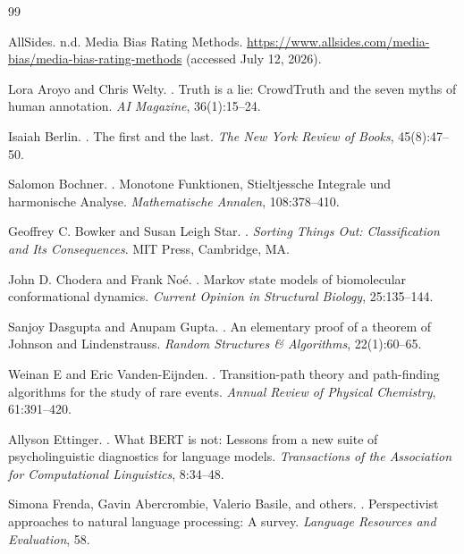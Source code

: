 \documentclass[12pt]{article}
\begin{document}
\newpage
\begin{thebibliography}{99}

AllSides.
\newblock n.d.
\newblock Media Bias Rating Methods.
\newblock \url{https://www.allsides.com/media-bias/media-bias-rating-methods} (accessed July 12, 2026).

Lora Aroyo and Chris Welty.
.
\newblock Truth is a lie: CrowdTruth and the seven myths of human annotation.
\newblock \emph{AI Magazine}, 36(1):15--24.

Isaiah Berlin.
.
\newblock The first and the last.
\newblock \emph{The New York Review of Books}, 45(8):47--50.

Salomon Bochner.
.
\newblock Monotone Funktionen, Stieltjessche Integrale und harmonische Analyse.
\newblock \emph{Mathematische Annalen}, 108:378--410.

Geoffrey C. Bowker and Susan Leigh Star.
.
\newblock \emph{Sorting Things Out: Classification and Its Consequences}.
\newblock MIT Press, Cambridge, MA.

John D. Chodera and Frank No\'{e}.
.
\newblock Markov state models of biomolecular conformational dynamics.
\newblock \emph{Current Opinion in Structural Biology}, 25:135--144.

Sanjoy Dasgupta and Anupam Gupta.
.
\newblock An elementary proof of a theorem of Johnson and Lindenstrauss.
\newblock \emph{Random Structures \& Algorithms}, 22(1):60--65.

Weinan E and Eric Vanden-Eijnden.
.
\newblock Transition-path theory and path-finding algorithms for the study of rare events.
\newblock \emph{Annual Review of Physical Chemistry}, 61:391--420.

Allyson Ettinger.
.
\newblock What {BERT} is not: Lessons from a new suite of psycholinguistic diagnostics for language models.
\newblock \emph{Transactions of the Association for Computational Linguistics}, 8:34--48.

Simona Frenda, Gavin Abercrombie, Valerio Basile, and others.
.
\newblock Perspectivist approaches to natural language processing: A survey.
\newblock \emph{Language Resources and Evaluation}, 58.


\end{thebibliography}
\end{document}
